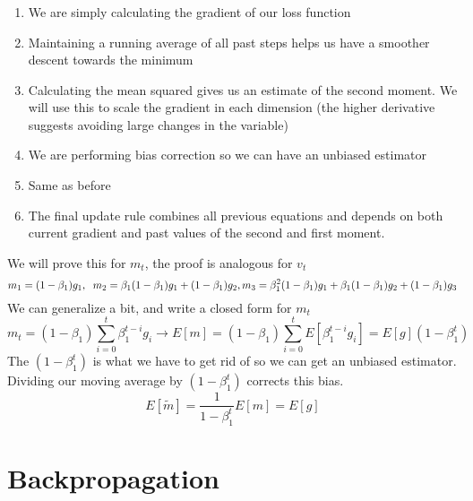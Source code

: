 \documentclass{article}
\begin{document}
\subsubsection{}
\begin{enumerate}[label=(\roman*)]
\item We are simply calculating the gradient of our loss function 
\item Maintaining a running average of all past steps helps us have a smoother descent towards the minimum 
\item 
Calculating the mean squared gives us an estimate of the second moment. We will use this to scale the gradient in each dimension (the higher derivative suggests avoiding large changes in the variable)
\item 
We are performing bias correction so we can have an unbiased estimator
\item
Same as before
\item 
The final update rule combines all previous equations and depends on both current gradient and past values of the second and first moment.
\end{enumerate}
We will prove this for $m_t$, the proof is analogous for $v_t$
\begin{equation}
    m_{1} = (1 - \beta_1)g_1, \hspace{0.2 cm} m_{2} = \beta_1 (1 - \beta_1) g_1 + (1 - \beta_1)g_2 , m_{3} = \beta_{1}^{2} (1 - \beta_{1}) g_{1}+ \beta_{1}(1 - \beta_{1}) g_2 + (1 - \beta_{1}) g_3
\end{equation}
We can generalize a bit, and write a closed form for $m_t$
\begin{equation}
    m_{t} = (1 - \beta_{1}) \sum_{i = 0}^{t} \beta_{1}^{t - i} g_{i} \rightarrow E[m] = (1 - \beta_{1}) \sum_{i = 0}^{t} E[\beta_{1}^{t - i} g_{i}] = E[g] (1 - \beta_{1}^{t})
\end{equation}
The $(1 - \beta_{1}^{t})$ is what we have to get rid of so we can get an unbiased estimator. Dividing our moving average by $(1 - \beta_{1}^{t})$ corrects this bias.
\begin{equation}
    E[\tilde{m}] = \frac{1}{1 - \beta_{1}^{t}} E[m]= E[g]
\end{equation}
\section{Backpropagation}
\end{document}
